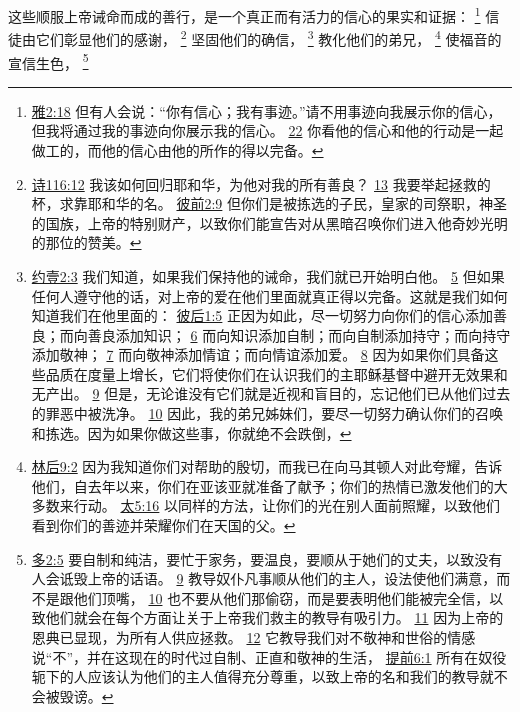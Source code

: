 \documentclass[12pt, a4paper, oneside]{ctexart}
\newcounter{parnum}[section]
\newcommand{\N}{%
   \noindent\refstepcounter{parnum}%
    \makebox[\parindent][l]{\textbf{\arabic{parnum}.}}}
\begin{document}
\N 这些顺服上帝诫命而成的善行，是一个真正而有活力的信心的果实和证据：
	\footnote {
		\href{https://biblehub.com/james/2-18.htm}{雅2:18} 但有人会说：“你有信心；我有事迹。”请不用事迹向我展示你的信心，但我将通过我的事迹向你展示我的信心。
		\href{https://biblehub.com/james/2-22.htm}{22} 你看他的信心和他的行动是一起做工的，而他的信心由他的所作的得以完备。
	}
	信徒由它们彰显他们的感谢，
	\footnote {
		\href{https://biblehub.com/psalms/116-12.htm}{诗116:12} 我该如何回归耶和华，为他对我的所有善良？
		\href{https://biblehub.com/psalms/116-13.htm}{13} 我要举起拯救的杯，求靠耶和华的名。
		\href{https://biblehub.com/1_peter/2-9.htm}{彼前2:9} 但你们是被拣选的子民，皇家的司祭职，神圣的国族，上帝的特别财产，以致你们能宣告对从黑暗召唤你们进入他奇妙光明的那位的赞美。
	}
	坚固他们的确信，
	\footnote {
		\href{https://biblehub.com/1_john/2-3.htm}{约壹2:3} 我们知道，如果我们保持他的诫命，我们就已开始明白他。
		\href{https://biblehub.com/1_john/2-5.htm}{5} 但如果任何人遵守他的话，对上帝的爱在他们里面就真正得以完备。这就是我们如何知道我们在他里面的：
		\href{https://biblehub.com/2_peter/1-5.htm}{彼后1:5} 正因为如此，尽一切努力向你们的信心添加善良；而向善良添加知识；
		\href{https://biblehub.com/2_peter/1-6.htm}{6} 而向知识添加自制；而向自制添加持守；而向持守添加敬神；
		\href{https://biblehub.com/2_peter/1-7.htm}{7} 而向敬神添加情谊；而向情谊添加爱。
		\href{https://biblehub.com/2_peter/1-8.htm}{8} 因为如果你们具备这些品质在度量上增长，它们将使你们在认识我们的主耶稣基督中避开无效果和无产出。
		\href{https://biblehub.com/2_peter/1-9.htm}{9} 但是，无论谁没有它们就是近视和盲目的，忘记他们已从他们过去的罪恶中被洗净。
		\href{https://biblehub.com/2_peter/1-10.htm}{10} 因此，我的弟兄姊妹们，要尽一切努力确认你们的召唤和拣选。因为如果你做这些事，你就绝不会跌倒， 
	}
	教化他们的弟兄，
	\footnote {
		\href{https://biblehub.com/2_corinthians/9-2.htm}{林后9:2} 因为我知道你们对帮助的殷切，而我已在向马其顿人对此夸耀，告诉他们，自去年以来，你们在亚该亚就准备了献予；你们的热情已激发他们的大多数来行动。
		\href{https://biblehub.com/matthew/5-16.htm}{太5:16} 以同样的方法，让你们的光在别人面前照耀，以致他们看到你们的善迹并荣耀你们在天国的父。
	}
	使福音的宣信生色，
	\footnote {
		\href{https://biblehub.com/titus/2-5.htm}{多2:5} 要自制和纯洁，要忙于家务，要温良，要顺从于她们的丈夫，以致没有人会诋毁上帝的话语。
		\href{https://biblehub.com/titus/2-9.htm}{9} 教导奴仆凡事顺从他们的主人，设法使他们满意，而不是跟他们顶嘴，
		\href{https://biblehub.com/titus/2-10.htm}{10} 也不要从他们那偷窃，而是要表明他们能被完全信，以致他们就会在每个方面让关于上帝我们救主的教导有吸引力。
		\href{https://biblehub.com/titus/2-11.htm}{11} 因为上帝的恩典已显现，为所有人供应拯救。
		\href{https://biblehub.com/titus/2-12.htm}{12} 它教导我们对不敬神和世俗的情感说“不”，并在这现在的时代过自制、正直和敬神的生活，
		\href{https://biblehub.com/1_timothy/6-1.htm}{提前6:1} 所有在奴役轭下的人应该认为他们的主人值得充分尊重，以致上帝的名和我们的教导就不会被毁谤。
	}
\end{document}
